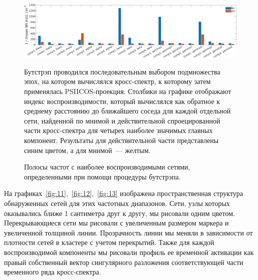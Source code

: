 \begin{figure}[h!tpb]
 \includegraphics[width=1\textwidth]{../images/psiicos_paper/Figure10_hr.jpg}
 \caption{Полосы частот с наиболее воспроизводимыми сетями, определенными при помощи
 процедуры бутстрэпа.}\label{fig:10}
 Бутстрэп проводился последовательным выбором подмножества эпох, на котором
 вычислялся кросс-спектр, к которому затем применялась PSIICOS-проекция.
 Столбики на графике отображают индекс воспроизводимости, который вычислялся
 как обратное к среднему расстоянию до ближайшего соседа для каждой отдельной
 сети, найденной по мнимой и действительной спроецированной части кросс-спектра для четырех
 наиболее значимых главных компонент. Результаты для действительной части представлены
 синим цветом, а для мнимой~--- желтым.
 \end{figure} %

 На графиках~\ref{fig:11},~\ref{fig:12},~\ref{fig:13} изображена пространственная
структура обнаруженных сетей для этих частотных диапазонов. Сети, узлы которых
оказывались ближе 1 сантиметра друг к другу, мы рисовали одним цветом. Перекрывающиеся сети
мы рисовали с увеличенным размером маркера и увеличенной толщиной линии. Прозрачность
линии мы меняли в зависимости от плотности сетей в кластере с учетом перекрытий.
Также для каждой воспроизводимой компоненты мы рисовали профиль ее временной активации
как правый собственный вектор сингулярного разложения соответствующей части временного
ряда кросс-спектра.

